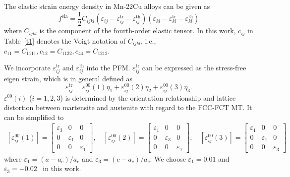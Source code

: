 \documentclass[reprint,3p,sort&compress,times,onecolumn]{elsarticle}
\begin{document}
The elastic strain energy  density in Mn-22Cu alloys can be given as
\begin{equation}
f^\text{ela} = \frac{1}{2} C_{ijkl} (\varepsilon_{ij} - \varepsilon_{ij}^{\text{tr}}-\varepsilon_{ij}^{\text{th}}) (\varepsilon_{kl} - \varepsilon_{kl}^{\text{tr}}-\varepsilon_{kl}^{\text{th}})  
\end{equation}
where $C_{ijkl}$ is the component of the fourth-order elastic tensor. In this work, $c_{ij}$ in Table~\ref{t1} denotes the Voigt notation of $C_{ijkl}$, i.e., $c_{11}=C_{1111}, c_{12}=C_{1122}, c_{44}=C_{1212}$.

We incorporate $\varepsilon_{ij}^{\text{tr}}$ and $\varepsilon_{ij}^{\text{th}}$ into the PFM. 
$\varepsilon^{\text{tr}}_{ij}$ can be expressed as the stress-free eigen strain, which is in general defined as
\begin{equation}
\varepsilon_{ij}^\text{tr} = \varepsilon_{ij}^{00}(1)\eta_1 + \varepsilon_{ij}^{00}(2)\eta_2 + \varepsilon_{ij}^{00}(3)\eta_3.
\end{equation}
$\varepsilon^{00}(i)$ ($i=1, 2, 3$) is determined by the orientation relationship and lattice distortion between martensite and austenite with regard to the FCC-FCT MT. It can be simplified to~\cite{artemev2001three}
\begin{equation}
\begin{split}
 \left[ \varepsilon_{ij}^{00}(1) \right] =\left[
\begin{array}{ccc}
\varepsilon_3 & 0 & 0 \\
0 & \varepsilon_1 & 0 \\
0 & 0 & \varepsilon_1
\end{array}
\right] ,\quad
\left[ \varepsilon_{ij}^{00}(2) \right] =\left[
\begin{array}{ccc}
\varepsilon_1 & 0 & 0 \\
0 & \varepsilon_3 & 0 \\
0 & 0 & \varepsilon_1
\end{array}
\right]  ,\quad
\left[ \varepsilon_{ij}^{00}(3) \right] =\left[
\begin{array}{ccc}
\varepsilon_1 & 0 & 0 \\
0 & \varepsilon_1 & 0 \\
0 & 0 & \varepsilon_3
\end{array}
\right]
\end{split}
\end{equation}
where $\varepsilon_1=(a-a_c)/a_c $ and $\varepsilon_3=(c-a_c)/a_c$. We choose $\varepsilon_1=0.01$ and $\varepsilon_3=-0.02$~\cite{cui2017three} in this work. 
\end{document}
